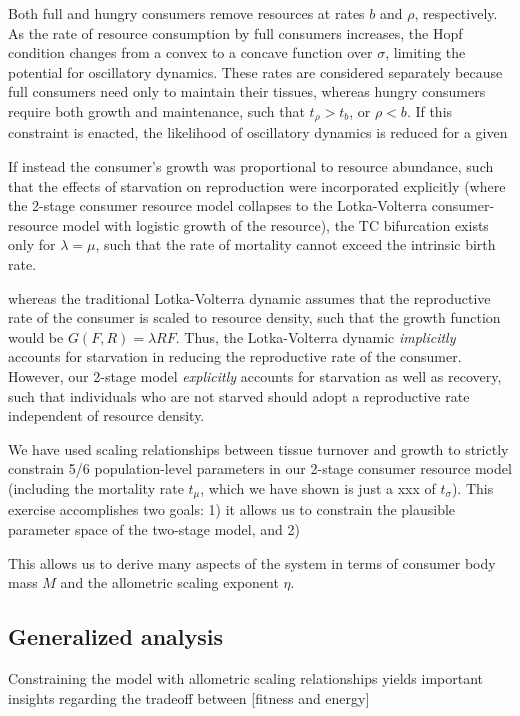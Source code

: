 \documentclass[12pt,english]{article}
\begin{document}
\begin{spacing}{1.9}
Both full and hungry consumers remove resources at rates $b$ and $\rho$, respectively.
As the rate of resource consumption by full consumers increases, the Hopf condition changes from a convex to a concave function over $\sigma$, limiting the potential for oscillatory dynamics.
These rates are considered separately because full consumers need only to maintain their tissues, whereas hungry consumers require both growth and maintenance, such that $t_\rho > t_b$, or $\rho < b$.
If this constraint is enacted, the likelihood of oscillatory dynamics is reduced for a given 



If instead the consumer's growth was proportional to resource abundance, such that the effects of starvation on reproduction were incorporated explicitly (where the 2-stage consumer resource model collapses to the Lotka-Volterra consumer-resource model with logistic growth of the resource), the TC bifurcation exists only for $\lambda = \mu$, such that the rate of mortality cannot exceed the intrinsic birth rate.


 whereas the traditional Lotka-Volterra dynamic assumes that the reproductive rate of the consumer is scaled to resource density, such that the growth function would be $G(F,R) = \lambda R F$.
Thus, the Lotka-Volterra dynamic \emph{implicitly} accounts for starvation in reducing the reproductive rate of the consumer.
However, our 2-stage model \emph{explicitly} accounts for starvation as well as recovery, such that individuals who are not starved should adopt a reproductive rate independent of resource density.



We have used scaling relationships between tissue turnover and growth to strictly constrain 5/6 population-level parameters in our 2-stage consumer resource model (including the mortality rate $t_\mu$, which we have shown is just a xxx of $t_\sigma$).
This exercise accomplishes two goals:
1) it allows us to constrain the plausible parameter space of the two-stage model, and 
2) 

This allows us to derive many aspects of the system in terms of consumer body mass $M$ and the allometric scaling exponent $\eta$.



\subsection{Generalized analysis}
Constraining the model with allometric scaling relationships yields important insights regarding the tradeoff between [fitness and energy]



\end{spacing}
\end{document}
